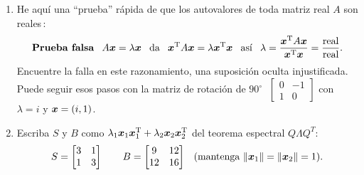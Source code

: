 \documentclass[12pt,a4paper]{article}
\newcommand{\bi}[1]{\hbox{\boldmath$#1$}}
\newcommand\1{\mbox{\,\vrule height-0.8pt depth1.0pt width2pc\,}}
\newcommand\2{\mbox{\,\vrule height-0.8pt depth1.0pt width1pc\,}}
\DeclareRobustCommand\transp{^{\mathrm{T}}}
\newcommand{\degree}{^{\circ}\;}
\newcommand{\la}{\lambda}
\newcommand{\La}{\Lambda}
\begin{document}
\begin{enumerate}
\item He aquí una ``prueba'' rápida de que los autovalores de toda matriz real $A$ son reales\,:
%
\[
\hbox{\bf Prueba falsa}\index{Prueba falsa}\quad
A\bi x=\la\bi x\quad\hbox{da}\quad \bi x\transp A\bi x=\la\bi
x\transp \bi x \quad\hbox{as\'i}\quad\la= \frac{\bi{x}\transp
  A\bi{x}}{\bi{x}\transp \bi{x}} = \frac{\hbox{real}}{\hbox{real}}.
\]
%
Encuentre la falla en este razonamiento, una suposici\'on oculta injustificada. Puede seguir esos pasos con la matriz de rotación de $90 \degree$ $\begin{bmatrix}0 & -1\\ 1& 0\end{bmatrix}$ con $\la=i$ y $\bi x=(i,1)$.

\item Escriba $S$ y $B$ como $\la_1\bi x_1\bi x\transp   _1+\la_2 \bi x_2 \bi x\transp _2$ del teorema espectral $Q\La  Q^T$:
%
\[
S = \begin{bmatrix} 3&1\\ 1&3\end{bmatrix} \qquad B =
\begin{bmatrix} 9&12\\ 12&16\end{bmatrix} \quad
\hbox{(mantenga  }\|\bi x_1\|=\|\bi x_2\|=1).
\]


\end{enumerate}
\end{document}

